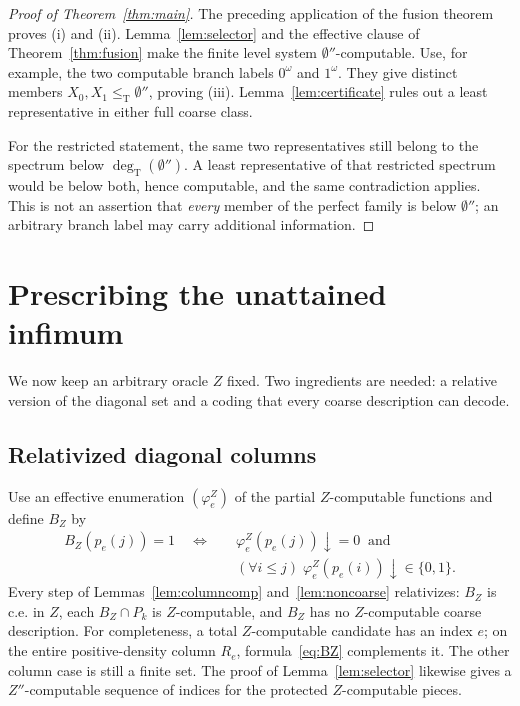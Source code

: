 \documentclass[11pt,a4paper]{article}
\newcommand{\leT}{\leq_{\mathrm T}}
\newcommand{\degT}{\operatorname{deg}_{\mathrm T}}
\theoremstyle{definition}
\theoremstyle{remark}
\begin{document}
\begin{proof}[Proof of Theorem~\ref{thm:main}]
The preceding application of the fusion theorem proves (i) and (ii).
Lemma~\ref{lem:selector} and the effective clause of
Theorem~\ref{thm:fusion} make the finite level system
$\emptyset''$-computable. Use, for example, the two computable branch
labels $0^\omega$ and $1^\omega$. They give distinct members
$X_0,X_1\leT\emptyset''$, proving (iii).
Lemma~\ref{lem:certificate} rules out a least representative in either
full coarse class.

For the restricted statement, the same two representatives still belong
to the spectrum below $\degT(\emptyset'')$. A least representative of
that restricted spectrum would be below both, hence computable, and the
same contradiction applies. This is not an assertion that \emph{every}
member of the perfect family is below $\emptyset''$; an arbitrary branch
label may carry additional information.
\end{proof}

\section{Prescribing the unattained infimum}\label{sec:relative}
We now keep an arbitrary oracle $Z$ fixed. Two ingredients are needed:
a relative version of the diagonal set and a coding that every coarse
description can decode.

\subsection{Relativized diagonal columns}
Use an effective enumeration $(\varphi_e^Z)$ of the partial $Z$-computable
functions and define $B_Z$ by
\begin{equation}\label{eq:BZ}
\begin{split}
 B_Z(p_e(j))=1\quad\Longleftrightarrow\quad &
 \varphi_e^Z(p_e(j))\downarrow=0\ \text{ and }\\[-2pt]
 &(\forall i\le j)\;
       \varphi_e^Z(p_e(i))\downarrow\in\{0,1\}.
\end{split}
\end{equation}
Every step of Lemmas~\ref{lem:columncomp} and~\ref{lem:noncoarse}
relativizes: $B_Z$ is c.e. in $Z$, each $B_Z\cap P_k$ is
$Z$-computable, and $B_Z$ has no $Z$-computable coarse description.
For completeness, a total $Z$-computable candidate has an index $e$;
on the entire positive-density column $R_e$, formula~\eqref{eq:BZ}
complements it. The other column case is still a finite set.
The proof of Lemma~\ref{lem:selector} likewise gives a $Z''$-computable
sequence of indices for the protected $Z$-computable pieces.
\end{document}
